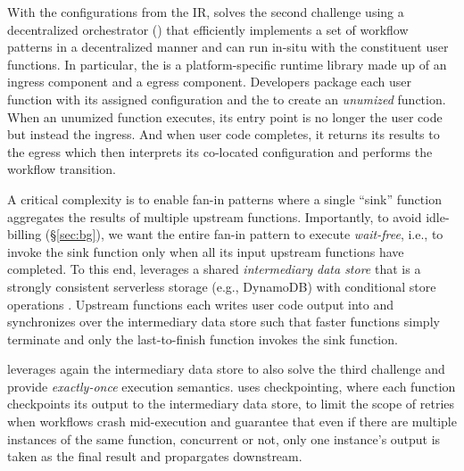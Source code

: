 With the configurations from the IR, \name{} solves the second challenge using
a decentralized orchestrator (\deorc)   that efficiently implements a set of
workflow patterns in a decentralized manner and can run in-situ with the
constituent user functions. In particular, the \deorc{} is a platform-specific
runtime library made up of an ingress component and a egress component.
Developers package each user function with its assigned \name{} configuration
and the \deorc{} to create an \emph{unumized} function. When an unumized
function executes, its entry point is no longer the user code but instead the
\deorc{} ingress. And when user code completes, it returns its results to the
\deorc{} egress which then interprets its co-located \name{} configuration and
performs the workflow transition.

A critical complexity is to enable fan-in patterns where a single ``sink''
function aggregates the results of multiple upstream functions. Importantly,
to avoid idle-billing (\S\ref{sec:bg}), we want the entire fan-in pattern to
execute \emph{wait-free}, i.e., to invoke the sink function only when all its
input upstream functions have completed. To this end, \name{} leverages a
shared \emph{intermediary data store} that is a strongly consistent  serverless
storage (e.g., DynamoDB) with conditional store operations . Upstream functions
each writes user code output into and synchronizes over the intermediary data
store such that faster functions simply terminate and only the last-to-finish
function invokes the sink function. 

\name{} leverages again the intermediary data store to also solve the third
challenge and provide \emph{exactly-once} execution semantics. \name{} uses
checkpointing, where each function checkpoints its output to the intermediary
data store, to limit the scope of retries when workflows crash mid-execution
and guarantee that even if there are multiple instances of the same function,
concurrent or not, only one instance's output is taken as the final result and
propargates downstream. 

